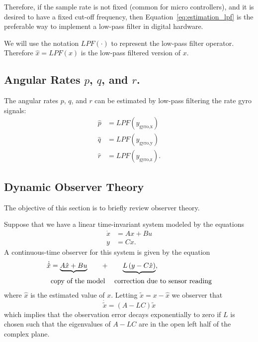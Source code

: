 {Therefore, if the sample rate is not fixed (common for micro
controllers), and it is desired to have a fixed cut-off frequency,
then Equation~\eqref{eq:estimation_lpf} is the preferable way to
implement a low-pass filter in digital hardware.

We will use the notation $LPF(\cdot)$ to represent the low-pass
filter operator.  Therefore $\hat{x} = LPF(x)$ is the low-pass
filtered version of $x$.



\subsection{Angular Rates $p$, $q$, and $r$.}

The angular rates $p$, $q$, and $r$ can be estimated by low-pass
filtering the rate gyro signals:
\begin{align}
\hat{p} &= LPF(y_{\text{gyro,x}})
    \label{eq:estimation_simple_p}
\\
\hat{q} &= LPF(y_{\text{gyro,y}})
    \label{eq:estimation_simple_q}
\\
\hat{r} &= LPF(y_{\text{gyro,z}})
    \label{eq:estimation_simple_r}.
\end{align}



\subsection{Dynamic Observer Theory}

The objective of this section is to briefly review observer theory.

Suppose that we have a linear time-invariant system modeled by the
equations
\begin{align*}
\dot{x} &= Ax + Bu \\
y&= Cx.
\end{align*}
A continuous-time observer for this system is given by the equation
\begin{align}
\dot{\hat{x}} &=
    \underbrace{A\hat{x} + Bu}
    \qquad + \qquad \underbrace{L\left( y - C\hat{x} \right)},
    \label{eq:estimation_continuous_observer} \\
    & \text{copy of the model} ~~~~ \text{correction due to sensor
    reading}
    \notag
\end{align}
where $\hat{x}$ is the estimated value of $x$.  Letting $\tilde{x} =
x-\hat{x}$ we observer that
\[
\dot{\tilde{x}} = (A-LC)\tilde{x}
\]
which implies that the observation error decays exponentially to
zero if $L$ is chosen such that the eigenvalues of $A-LC$ are in the
open left half of the complex plane.

}
